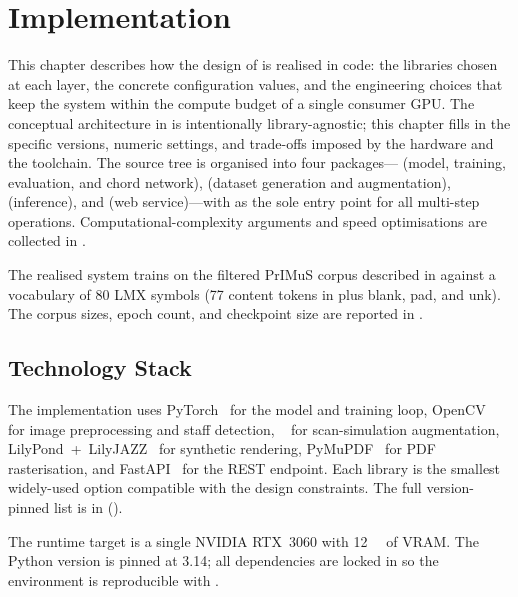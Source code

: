 \chapter{Implementation}
\label{ch:impl}

This chapter describes how the design of  is realised
in code: the libraries chosen at each layer, the concrete configuration
values, and the engineering choices that keep the system within the
compute budget of a single consumer GPU.
The conceptual architecture in  is intentionally
library-agnostic; this chapter fills in the specific versions, numeric
settings, and trade-offs imposed by the hardware and the toolchain.
The source tree is organised into four packages---
(model, training, evaluation, and chord network), 
(dataset generation and augmentation),  (inference),
and  (web service)---with  as the sole entry
point for all multi-step operations.
Computational-complexity arguments and speed optimisations are
collected in .

The realised system trains on the filtered PrIMuS corpus described in
 against a vocabulary of \num{80} LMX symbols
(\num{77} content tokens in  plus
blank, pad, and unk). The corpus sizes, epoch count, and checkpoint
size are reported in .

\section{Technology Stack}
\label{sec:impl-stack}

The implementation uses PyTorch~\cite{paszkeImperativeStyleHighPerformance2019}
for the model and training loop, OpenCV~\cite{bradskiOpenCVLibrary2000} for
image preprocessing and staff detection,
~\cite{AlbumentationsFastFlexible} for scan-simulation
augmentation, LilyPond~+~LilyJAZZ~\cite{nienhuysLilyPondSystem2003,hammerleOpenLilyPondFontsLilyJAZZ}
for synthetic rendering, PyMuPDF~\cite{artifexPyMuPDF} for PDF
rasterisation, and FastAPI~\cite{ramirezFastAPI} for the REST endpoint.
Each library is the smallest widely-used option compatible with the
design constraints. The full version-pinned list is in
 ().

The runtime target is a single NVIDIA RTX~3060 with \SI{12}{\giga\byte}
of VRAM.
The Python version is pinned at \num{3.14}; all dependencies are
locked in  so the environment is reproducible with
.


